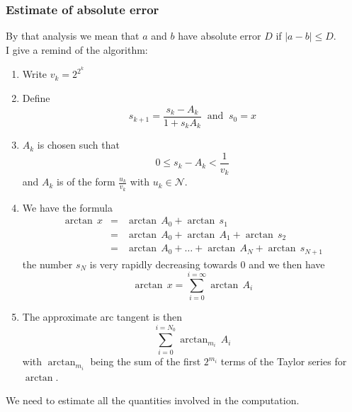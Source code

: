 \documentclass[12pt]{amsart}
\def\N{{\mathcal N}}
\begin{document}
\subsubsection{Estimate of absolute error}
\noindent By that analysis we mean that $a$ and $b$ have absolute error $D$ if $|a-b|\leq D$.\\
I give a remind of the algorithm:
\begin{enumerate}
\item Write $v_k=2^{2^k}$
\item Define
\begin{equation*}
s_{k+1}=\frac{s_k-A_k}{1+s_kA_k}\;\;\mbox{and}\;\;s_0=x
\end{equation*}
\item $A_k$ is chosen such that
\begin{equation*}
0\leq s_k-A_k<\frac{1}{v_k}
\end{equation*}
and $A_k$ is of the form $\frac{u_k}{v_k}$ with $u_k\in\N$.
\item We have the formula
\begin{equation*}
\begin{array}{rcl}
\arctan\,x
&=&\arctan\,A_0+\arctan\,s_1\\
&=&\arctan\,A_0+\arctan\,A_1+\arctan\,s_2\\
&=&\arctan\,A_0+\dots+\arctan\,A_N+\arctan\,s_{N+1}
\end{array}
\end{equation*}
the number $s_N$ is very rapidly decreasing towards $0$ and we then have
\[\arctan\,x = \sum_{i=0}^{i=\infty}\arctan\,A_i\]
\item The approximate arc tangent is then
\[\sum_{i=0}^{i=N_0}\arctan_{m_i}\,A_i\]
with $\arctan_{m_i}$ being the sum of the first $2^{m_i}$ terms of the
Taylor series for $\arctan$.
\end{enumerate}
We need to estimate all the quantities involved in the computation.
\end{document}
